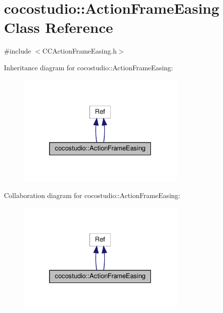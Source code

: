 \hypertarget{classcocostudio_1_1ActionFrameEasing}{}\section{cocostudio\+:\+:Action\+Frame\+Easing Class Reference}
\label{classcocostudio_1_1ActionFrameEasing}


{\ttfamily \#include $<$C\+C\+Action\+Frame\+Easing.\+h$>$}



Inheritance diagram for cocostudio\+:\+:Action\+Frame\+Easing\+:
\nopagebreak
\begin{figure}[H]
\begin{center}
\leavevmode
\includegraphics[width=235pt]{classcocostudio_1_1ActionFrameEasing__inherit__graph}
\end{center}
\end{figure}


Collaboration diagram for cocostudio\+:\+:Action\+Frame\+Easing\+:
\nopagebreak
\begin{figure}[H]
\begin{center}
\leavevmode
\includegraphics[width=235pt]{classcocostudio_1_1ActionFrameEasing__coll__graph}
\end{center}
\end{figure}

